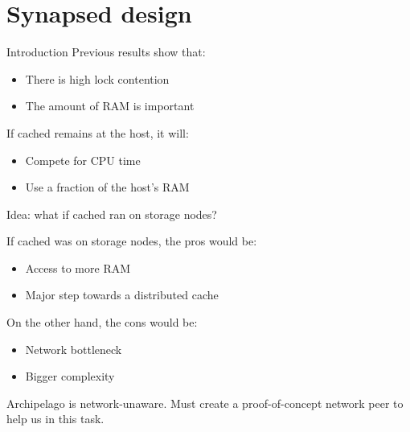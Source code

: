 \section{Synapsed design}

\begin{frame}{Introduction}
	Previous results show that:
	\begin{itemize}
		\item There is high lock contention
		\item The amount of RAM is important
	\end{itemize}
	\dspc
	If cached remains at the host, it will:
	\begin{itemize}
		\item Compete for CPU time
		\item Use a fraction of the host's RAM
	\end{itemize}
	\dspc
	Idea: what if cached ran on storage nodes?
\end{frame}

\begin{frame}
	If cached was on storage nodes, the pros would be:
	\begin{itemize}
		\item Access to more RAM
		\item Major step towards a distributed cache
	\end{itemize}
	\dspc
	On the other hand, the cons would be:
	\begin{itemize}
		\item Network bottleneck
		\item Bigger complexity
	\end{itemize}
	\dspc
	Archipelago is network-unaware. Must create a proof-of-concept network peer 
	to help us in this task.
\end{frame}

